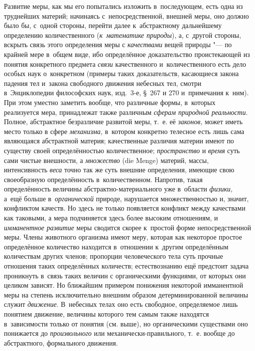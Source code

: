 Развитие меры, как мы его попытались изложить в~последующем, есть одна из
труднейших материй; начинаясь с~непосредственной, внешней меры, оно должно было
бы, с~одной стороны, перейти далее к~абстрактному дальнейшему определению
количественного ({\em к~математике природы}), а, с~другой стороны, вскрыть
связь этого определения меры с {\em качествами} вещей природы "--- по крайней
мере в~общем виде, ибо определённое доказательство проистекающей из понятия
конкретного предмета {\em связи} качественного и~количественного есть дело
особых наук о~конкретном (примеры таких доказательств, касающиеся закона
падения тел и~закона свободного движения небесных тел, смотри в~Энциклопедии
философских наук, изд.~3-е, \S~267 и 270 и~примечания к~ним). При этом уместно
заметить вообще, что различные формы, в~которых реализуется мера, принадлежат
также различным {\em сферам природной реальности}. Полное, абстрактное
безразличие развитой меры, т.~е. её {\em законов,} может иметь место только в
сфере {\em механизма,} в~котором конкретно телесное есть лишь сама являющаяся
абстрактной материя; качественные различия материи имеют по существу своей
определённостью количественное; {\em пространство} и {\em время} суть сами
чистые внешности, а {\em множество} (die Menge) материй, массы, интенсивность
{\em веса} точно так же суть внешние определения, имеющие свою своеобразную
определённость в~количественном. Напротив, такая определённость величины
абстрактно-материального уже в~области {\em физики,} а~ещё больше
в~{\em органической} природе, нарушается множественностью и, значит, конфликтом
качеств. Но здесь не только появляется конфликт между качествами как таковыми,
а мера подчиняется здесь более высоким отношениям, и {\em имманентное развитие}
меры сводится скорее к~простой форме непосредственной меры. Члены животного
организма имеют меру, которая как некоторое простое определённое количество
находится в~отношении к~другим определённым количествам других членов;
пропорции человеческого тела суть прочные отношения таких определённых
количеств; естествознанию ещё предстоит задача проникнуть в~связь таких величин
с органическими функциями, от которых они целиком зависят. Но ближайшим
примером понижения некоторой имманентной меры на степень исключительно внешним
образом детерминированной величины служит {\em движение}. В~небесных телах оно
есть свободное, определяемое лишь понятием движение, величины которого тем
самым также находятся в~зависимости только от понятия (см. выше), но
органическими существами оно понижается до {\em произвольного} или
механически-правильного, т.~е. вообще до абстрактного, формального движения.

